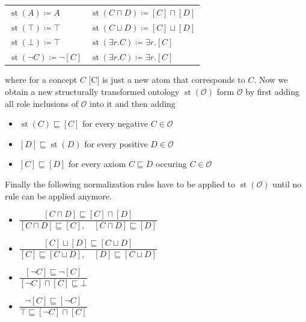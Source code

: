 \documentclass[titlepage]{article}
\DeclareMathOperator{\st}{st}
\begin{document}
\begin{center}

\begin{tabular}{l l }
$\st(A) \coloneqq  A$ & $\st(C \sqcap D) \coloneqq  [C] \sqcap [D]$\\
$\st(\top) \coloneqq \top$ & $\st(C \sqcup D) \coloneqq [C] \sqcup [D]$ \\
$\st(\bot) \coloneqq \top$ & $\st(\exists r.C) \coloneqq \exists r.[C]$\\
$\st(\neg C) \coloneqq \neg [C]$ & $\st(\exists r.C) \coloneqq \exists r.[C]$\\
\end{tabular}
\end{center}
where for a concept $C$ [C] is just a new atom that corresponds to $C$.
Now we obtain a new structurally transformed ontology $\st(\mathcal{O})$ form $\mathcal{O}$ by
first adding all role inclusions of $\mathcal{O}$ into it and then adding 
\begin{itemize}
  \item $\st(C) \sqsubseteq [C]$ for every negative $ C \in \mathcal{O}$ 
  \item $[D]\sqsubseteq \st(D)$ for every positive $D \in \mathcal{O}$
  \item $[C] \sqsubseteq [D]$ for every axiom $C \sqsubseteq D$ occuring $C \in \mathcal{O}$
\end{itemize}

Finally the following normalization rules have to be applied to $\st(\mathcal{O})$ until no rule can be applied
anymore.

  \begin{itemize}
    \item $ \dfrac{[C \sqcap D] \sqsubseteq [C] \sqcap [D]}{ [C \sqcap D] \sqsubseteq [C], \quad [C \sqcap D] \sqsubseteq [D]}$
    \item $ \dfrac{[C] \sqcup [D] \sqsubseteq [C \sqcup D]}{ [C] \sqsubseteq [C \sqcup D], \quad [D] \sqsubseteq [C \sqcup D]}$
    \item $ \dfrac{[\neg C] \sqsubseteq \neg [C] }{ [\neg C ] \sqcap [C] \sqsubseteq \bot}$
    \item $ \dfrac{\neg [C] \sqsubseteq [\neg C] }{ \top \sqsubseteq [\neg C ] \sqcap [C]}$
  \end{itemize}
\end{document}
